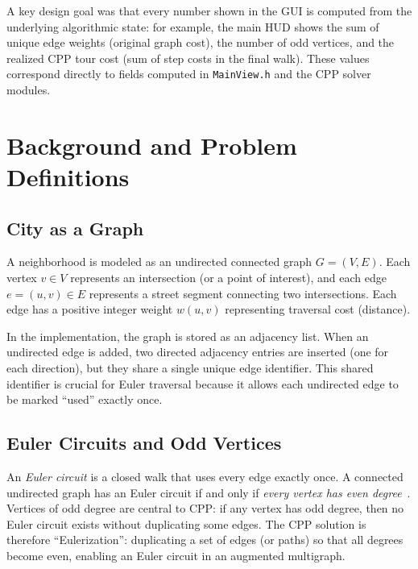 \documentclass[conference]{IEEEtran}
\begin{document}
A key design goal was that every number shown in the GUI is computed from the underlying algorithmic state:
for example, the main HUD shows the sum of unique edge weights (original graph cost), the number of odd vertices, and the realized CPP tour cost (sum of step costs in the final walk).
These values correspond directly to fields computed in \texttt{MainView.h} and the CPP solver modules.

\section{Background and Problem Definitions}
\subsection{City as a Graph}
A neighborhood is modeled as an undirected connected graph $G=(V,E)$.
Each vertex $v\in V$ represents an intersection (or a point of interest), and each edge $e=(u,v)\in E$ represents a street segment connecting two intersections.
Each edge has a positive integer weight $w(u,v)$ representing traversal cost (distance).

In the implementation, the graph is stored as an adjacency list.
When an undirected edge is added, two directed adjacency entries are inserted (one for each direction), but they share a single unique edge identifier.
This shared identifier is crucial for Euler traversal because it allows each undirected edge to be marked ``used'' exactly once.

\subsection{Euler Circuits and Odd Vertices}
An \emph{Euler circuit} is a closed walk that uses every edge exactly once.
A connected undirected graph has an Euler circuit if and only if \emph{every vertex has even degree}~\cite{ref_euler_mathworld}.
Vertices of odd degree are central to CPP: if any vertex has odd degree, then no Euler circuit exists without duplicating some edges.
The CPP solution is therefore ``Eulerization'': duplicating a set of edges (or paths) so that all degrees become even, enabling an Euler circuit in an augmented multigraph.
\end{document}
